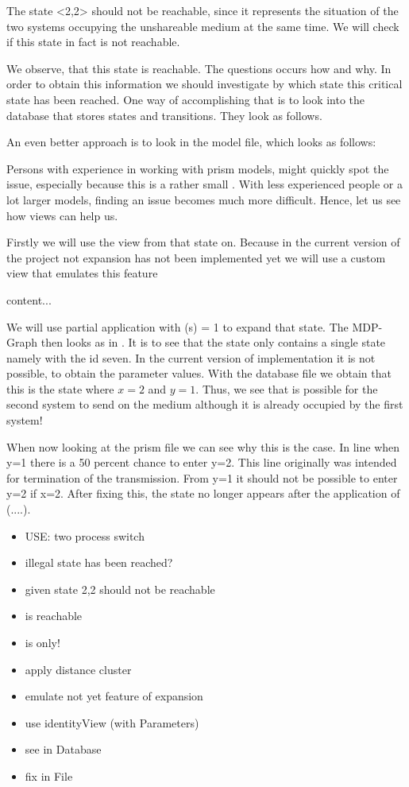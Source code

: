 \documentclass[preview]{standalone}
\begin{document}
The state <2,2> should not be reachable, since it represents the situation of the two systems occupying the unshareable medium at the same time. We will check if this state in fact is not reachable.

We observe, that this state is reachable. The questions occurs how and why. In order to obtain this information we should investigate by which state this critical state has been reached. One way of accomplishing that is to look into the database that stores states and transitions. They look as follows. 

An even better approach is to look in the model file, which looks as follows:

Persons with experience in working with prism models, might quickly spot the issue, especially because this is a rather small \mdp. With less experienced people or a lot larger models, finding an issue becomes much more difficult. Hence, let us see how views can help us.

Firstly we will use the view \viewdistance from that state on. Because in the current version of the project not expansion has not been implemented yet we will use a custom view that emulates this feature

\begin{definition}
	content...
\end{definition}

We will use partial application with \gfctdistance(s) = 1 to expand that state. The MDP-Graph then looks as in . It is to see that the state only contains a single state namely with the id seven. In the current version of implementation it is not possible, to obtain the parameter values. With the database file we obtain that this is the state where $x=2$ and $y=1$. Thus, we see that is possible for the second system to send on the medium although it is already occupied by the first system!

When now looking at the prism file we can see why this is the case. In line when y=1 there is a 50 percent chance to enter y=2. This line originally was intended for termination of the transmission. From y=1 it should not be possible to enter y=2 if x=2. After fixing this, the state no longer appears after the application of \viewparamdnf(....).

	
	\begin{itemize}
		\item USE: two process switch 
		\item illegal state has been reached?
		\item given state 2,2 should not be reachable
		\item is reachable
		\item is only!
		\item apply distance cluster
		\item emulate not yet feature of expansion
		\item use identityView (with Parameters)
		\item see in Database
		\item fix in File
	\end{itemize}
\end{document}
